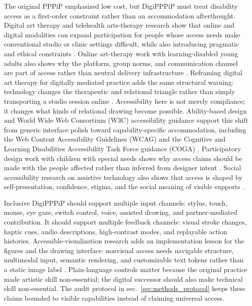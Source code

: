 \documentclass[
  english,
]{article}
\begin{document}
The original PPPiP emphasized low cost, but DigiPPPiP must treat
disability access as a first-order constraint rather than an
accommodation afterthought. Digital art therapy and telehealth
arts-therapy research show that online and digital modalities can expand
participation for people whose access needs make conventional studio or
clinic settings difficult, while also introducing pragmatic and ethical
constraints
\citep{zubala2021digitalarttherapy, reitere2024telehealth, potash2020pandemics}.
Online art-therapy work with learning-disabled young adults also shows
why the platform, group norms, and communication channel are part of
access rather than neutral delivery infrastructure
\citep{datlen2020whatsapp}. Reframing digital art therapy for digitally
mediated practice adds the same structural warning: technology changes
the therapeutic and relational triangle rather than simply transporting
a studio session online \citep{haywood2022hexagonal}. Accessibility here
is not merely compliance; it changes what kinds of relational drawing
become possible. Ability-based design and World Wide Web Consortium
(W3C) accessibility guidance support this shift from generic interface
polish toward capability-specific accommodation, including the Web
Content Accessibility Guidelines (WCAG) and the Cognitive and Learning
Disabilities Accessibility Task Force guidance (COGA)
\citep{wobbrock2011ability, w3c2023wcag22, w3c2021coga}. Participatory
design work with children with special needs shows why access claims
should be made with the people affected rather than inferred from
designer intent \citep{frauenberger2011participatory}. Social
accessibility research on assistive technology also shows that access is
shaped by self-presentation, confidence, stigma, and the social meaning
of visible supports \citep{shinohara2016socialaccess}.

Inclusive DigiPPPiP should support multiple input channels: stylus,
touch, mouse, eye gaze, switch control, voice, assisted drawing, and
partner-mediated contribution. It should support multiple feedback
channels: visual stroke changes, haptic cues, audio descriptions,
high-contrast modes, and replayable action histories.
Accessible-visualization research adds an implementation lesson for the
figures and the drawing interface: nonvisual access needs navigable
structure, multimodal input, semantic rendering, and customizable text
tokens rather than a static image label
\citep{elavsky2024datanavigator, jones2024customization}. Plain-language
controls matter because the original practice made artistic skill
non-essential; the digital successor should also make technical skill
non-essential. The audit protocol in sec.~\ref{sec:methods_protocol}
keeps these claims bounded to visible capabilities instead of claiming
universal access.
\end{document}
